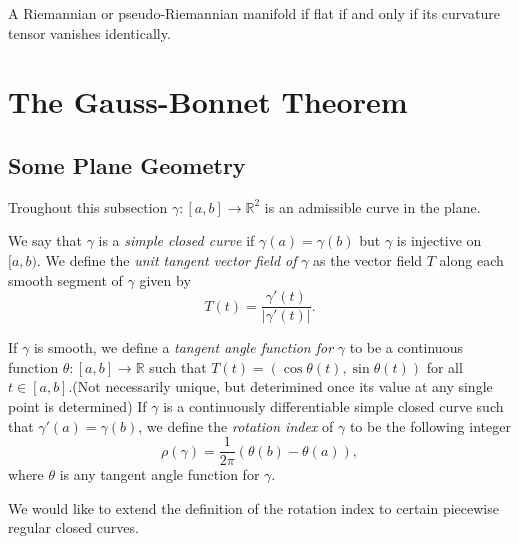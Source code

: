 \begin{theorem}
  \label{theorem-flat-iff-curvature-vanish}
  A Riemannian or pseudo-Riemannian manifold if flat if and only if its curvature tensor vanishes identically.
\end{theorem}

\section{The Gauss-Bonnet Theorem}
\label{section-Gauss-Bonnet}

\subsection{Some Plane Geometry}
\label{subsection-some-plane-geometry}

Troughout this subsection \( \gamma: [a, b] \to \mathbb{R}^2 \) is an admissible curve in the plane.

\begin{definition}
  \label{definition-simple-closed-curve}
  \label{definition-unit-tangent-vector-field}
  We say that \( \gamma \) is a \emph{simple closed curve} if \( \gamma(a) = \gamma(b) \) but \( \gamma \) is injective on \( [a, b) \).
  We define the \emph{unit tangent vector field of} \( \gamma \) as the vector field \( T \) along each smooth segment of \( \gamma \) given by
  \[
    T(t) = \frac{\gamma'(t)}{\left\lvert \gamma'(t) \right\rvert}.
  \]
\end{definition}

\begin{definition}
  \label{definition-smooth-tangent-angle-function}
  \label{definition-smooth-rotation-index}
  If \( \gamma \) is smooth, we define a \emph{tangent angle function for} \( \gamma \) to be a continuous function \( \theta: [a, b] \to \mathbb{R} \) such that \( T(t) = (\cos \theta(t), \sin \theta (t)) \) for all \( t \in [a, b] \).(Not necessarily unique, but deterimined once its value at any single point is determined)
  If \( \gamma \) is a continuously differentiable simple closed curve such that \( \gamma'(a) = \gamma(b) \), we define the \emph{rotation index} of \( \gamma \) to be the following integer
  \[
  \rho(\gamma)  = \frac{1}{2 \pi} (\theta(b) - \theta(a)),
  \]
  where \( \theta \) is any tangent angle function for \( \gamma \).
\end{definition}

We would like to extend the definition of the rotation index to certain piecewise regular closed curves.

